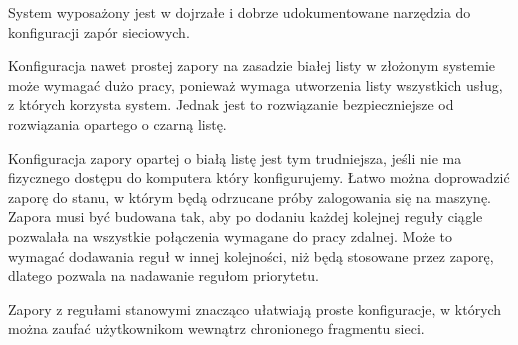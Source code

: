 System \bsd{} wyposażony jest w dojrzałe i dobrze udokumentowane narzędzia do
konfiguracji zapór sieciowych.

Konfiguracja nawet prostej zapory na zasadzie białej listy w złożonym systemie
może wymagać dużo pracy, ponieważ wymaga utworzenia listy wszystkich usług, z
których korzysta system. Jednak jest to rozwiązanie bezpieczniejsze od
rozwiązania opartego o czarną listę.

Konfiguracja zapory opartej o białą listę jest tym trudniejsza, jeśli nie ma
fizycznego dostępu do komputera który konfigurujemy. Łatwo można doprowadzić
zaporę do stanu, w którym będą odrzucane próby zalogowania się na maszynę.
Zapora musi być budowana tak, aby po dodaniu każdej kolejnej reguły ciągle
pozwalała na wszystkie połączenia wymagane do pracy zdalnej. Może to wymagać
dodawania reguł w innej kolejności, niż będą stosowane przez zaporę, dlatego
\ipfw{} pozwala na nadawanie regułom priorytetu.

Zapory z regułami stanowymi znacząco ułatwiają proste konfiguracje, w których
można zaufać użytkownikom wewnątrz chronionego fragmentu sieci.
